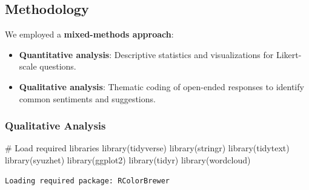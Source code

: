 \documentclass[
  letterpaper,
  DIV=11,
  numbers=noendperiod]{scrartcl}
\newenvironment{Shaded}{\begin{snugshade}}{\end{snugshade}}
\newcommand{\CommentTok}[1]{\textcolor[rgb]{0.37,0.37,0.37}{#1}}
\newcommand{\FunctionTok}[1]{\textcolor[rgb]{0.28,0.35,0.67}{#1}}
\newcommand{\NormalTok}[1]{\textcolor[rgb]{0.00,0.23,0.31}{#1}}
\providecommand{\tightlist}{%
  \setlength{\itemsep}{0pt}\setlength{\parskip}{0pt}}\usepackage{longtable,booktabs,array}
\begin{document}
\subsection{Methodology}\label{methodology}

We employed a \textbf{mixed-methods approach}:

\begin{itemize}
\tightlist
\item
  \textbf{Quantitative analysis}: Descriptive statistics and
  visualizations for Likert-scale questions.
\item
  \textbf{Qualitative analysis}: Thematic coding of open-ended responses
  to identify common sentiments and suggestions.
\end{itemize}

\subsubsection{Qualitative Analysis}\label{qualitative-analysis}

\begin{Shaded}
\begin{Highlighting}[]
\CommentTok{\# Load required libraries}
\FunctionTok{library}\NormalTok{(tidyverse)}
\FunctionTok{library}\NormalTok{(stringr)}
\FunctionTok{library}\NormalTok{(tidytext)}
\FunctionTok{library}\NormalTok{(syuzhet)}
\FunctionTok{library}\NormalTok{(ggplot2)}
\FunctionTok{library}\NormalTok{(tidyr)}
\FunctionTok{library}\NormalTok{(wordcloud)}
\end{Highlighting}
\end{Shaded}

\begin{verbatim}
Loading required package: RColorBrewer
\end{verbatim}
\end{document}
